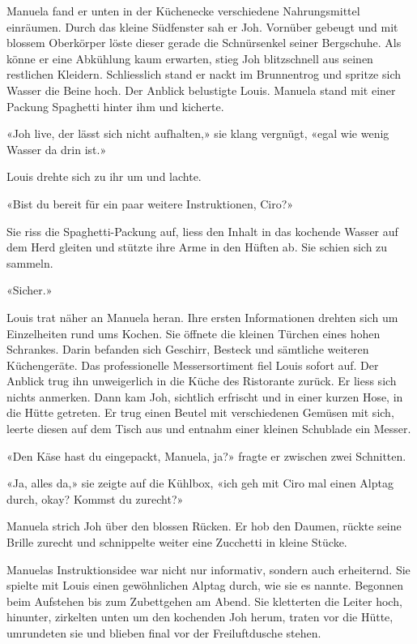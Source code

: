 Manuela fand er unten in der Küchenecke verschiedene Nahrungsmittel
einräumen. Durch das kleine Südfenster sah er Joh. Vornüber gebeugt und
mit blossem Oberkörper löste dieser gerade die Schnürsenkel seiner
Bergschuhe. Als könne er eine Abkühlung kaum erwarten, stieg Joh
blitzschnell aus seinen restlichen Kleidern. Schliesslich stand er nackt
im Brunnentrog und spritze sich Wasser die Beine hoch. Der Anblick
belustigte Louis. Manuela stand mit einer Packung Spaghetti hinter ihm und kicherte.

«Joh live, der lässt sich nicht aufhalten,» sie klang vergnügt, «egal
wie wenig Wasser da drin ist.»

Louis drehte sich zu ihr um und lachte.

«Bist du bereit für ein paar weitere Instruktionen, Ciro?»

Sie riss die Spaghetti-Packung auf, liess den Inhalt in das kochende
Wasser auf dem Herd gleiten und stützte ihre Arme in den Hüften ab. Sie
schien sich zu sammeln.

«Sicher.»

Louis trat näher an Manuela heran. Ihre ersten Informationen drehten
sich um Einzelheiten rund ums Kochen. Sie öffnete die kleinen Türchen
eines hohen Schrankes. Darin befanden sich Geschirr, Besteck und
sämtliche weiteren Küchengeräte. Das professionelle Messersortiment fiel
Louis sofort auf. Der Anblick trug ihn unweigerlich in die Küche des
Ristorante zurück. Er liess sich nichts anmerken.
Dann kam Joh, sichtlich erfrischt und in einer kurzen Hose, in die Hütte
getreten. Er trug einen Beutel mit verschiedenen Gemüsen mit sich,
leerte diesen auf dem Tisch aus und entnahm einer kleinen Schublade ein
Messer.

«Den Käse hast du eingepackt, Manuela, ja?» fragte er zwischen zwei
Schnitten.

«Ja, alles da,» sie zeigte auf die Kühlbox, «ich geh mit Ciro mal einen
Alptag durch, okay? Kommst du zurecht?»

Manuela strich Joh über den blossen Rücken. Er hob den Daumen, rückte
seine Brille zurecht und schnippelte weiter eine Zucchetti in kleine
Stücke.

Manuelas Instruktionsidee war nicht nur informativ, sondern auch
erheiternd. Sie spielte mit Louis einen gewöhnlichen Alptag durch,
wie sie es nannte. Begonnen beim Aufstehen bis zum Zubettgehen am Abend.
Sie kletterten die Leiter hoch, hinunter, zirkelten unten um den
kochenden Joh herum, traten vor die Hütte, umrundeten sie und blieben
final vor der Freiluftdusche stehen. 

